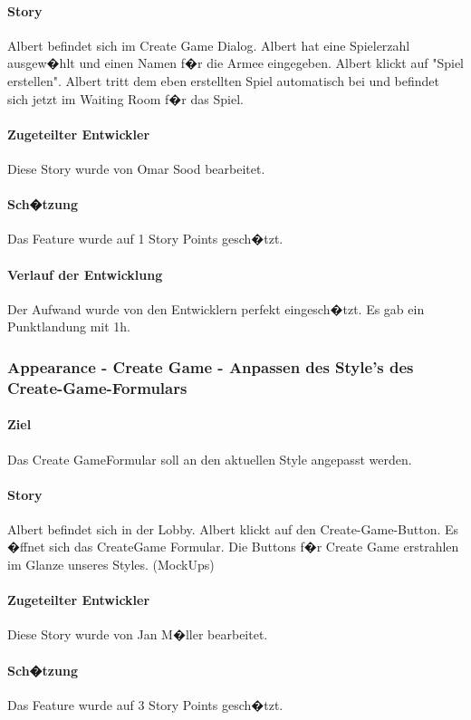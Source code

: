 \documentclass[12pt, titlepage]{scrartcl}
\begin{document}
			\paragraph{Story} Albert befindet sich im Create Game Dialog. Albert hat eine Spielerzahl ausgew�hlt und einen Namen f�r die Armee eingegeben. Albert klickt auf "Spiel erstellen". Albert tritt dem eben erstellten Spiel automatisch bei und befindet sich jetzt im Waiting Room f�r das Spiel.
			\paragraph{Zugeteilter Entwickler} Diese Story wurde von Omar Sood bearbeitet.
			\paragraph{Sch�tzung}
			Das Feature wurde auf 1 Story Points gesch�tzt.
			\paragraph{Verlauf der Entwicklung} 
			Der Aufwand wurde von den Entwicklern perfekt eingesch�tzt. Es gab ein Punktlandung mit 1h. 
			
			\subsubsection{Appearance - Create Game - Anpassen des Style's des Create-Game-Formulars}
			\paragraph{Ziel} Das \glqq Create Game\grqq Formular soll an den aktuellen Style angepasst werden.
			\paragraph{Story} Albert befindet sich in der Lobby. Albert klickt auf den Create-Game-Button. Es �ffnet sich das CreateGame Formular. Die Buttons f�r Create Game erstrahlen im Glanze unseres Styles. (MockUps)
			\paragraph{Zugeteilter Entwickler} Diese Story wurde von Jan M�ller bearbeitet.
			\paragraph{Sch�tzung}
			Das Feature wurde auf 3 Story Points gesch�tzt.
\end{document}
